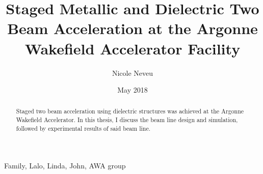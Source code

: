 \documentclass{iitthesis}
\begin{document}
\title{Staged Metallic and Dielectric Two Beam Acceleration at the Argonne Wakefield Accelerator Facility}

\author{Nicole Neveu }
\date{May 2018}
\copyrightnoticetrue      %
\maketitle                %


\prelimpages         %

\begin{acknowledgement}     %
	\par  Family, Lalo, Linda, John, AWA group
\end{acknowledgement}

\tableofcontents
\clearpage

\listoftables

\clearpage

\listoffigures

\clearpage


\listofsymbols
{}

\clearpage

\begin{abstract}           %
	\par Staged two beam acceleration using dielectric structures was achieved
	at the Argonne Wakefield Accelerator. In this thesis, I discuss the beam 
	line design and simulation, followed by experimental results of said
	beam line.  
\end{abstract}


\textpages     %


 \label{sec:int}
\end{document}
